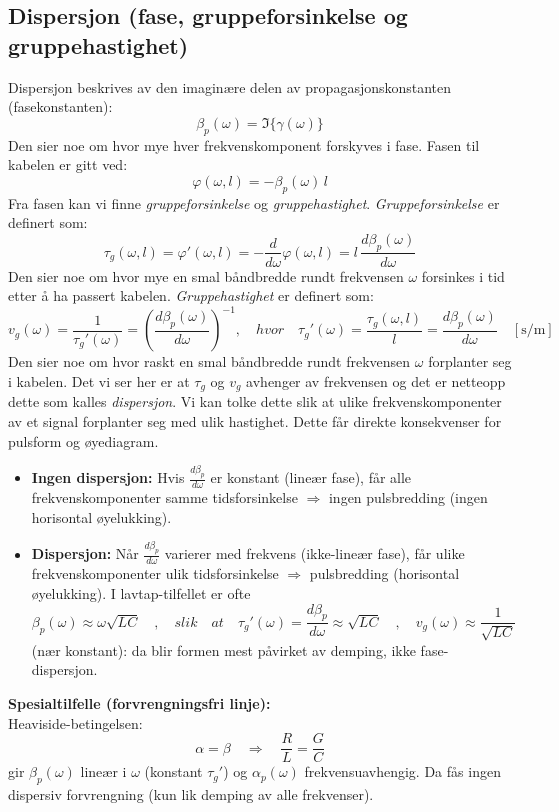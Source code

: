 \subsection{Dispersjon (fase, gruppeforsinkelse og gruppehastighet)}
Dispersjon beskrives av den imaginære delen av propagasjonskonstanten (fasekonstanten):
\[
    \beta_p(\omega)=\Im\{\gamma(\omega)\}
\]
Den sier noe om hvor mye hver frekvenskomponent forskyves i fase.
Fasen til kabelen er gitt ved:
\[
\varphi(\omega,l) = -\beta_p(\omega)\,l
\]
Fra fasen kan vi finne \emph{gruppeforsinkelse} og \emph{gruppehastighet}.
\emph{Gruppeforsinkelse} er definert som:
\[
\tau_g(\omega,l) = \varphi'(\omega,l) = -\frac{d}{d\omega}\varphi(\omega,l) = l\,\frac{d\beta_p(\omega)}{d\omega}
\]
Den sier noe om hvor mye en smal båndbredde rundt frekvensen \(\omega\) forsinkes i tid etter å ha passert kabelen. \emph{Gruppehastighet} er definert som:
\[
v_g(\omega) = \frac{1}{\tau_{g}'(\omega)} = \left(\frac{d\beta_p(\omega)}{d\omega}\right)^{-1}, \quad hvor \quad \tau_g'(\omega) = \frac{\tau_g(\omega,l)}{l} = \frac{d\beta_p(\omega)}{d\omega} \quad [\mathrm{s/m}]
\]
\noindent Den sier noe om hvor raskt en smal båndbredde rundt frekvensen \(\omega\) forplanter seg i kabelen. Det vi ser her er at \(\tau_g\) og \(v_g\) avhenger av frekvensen og det er netteopp dette som kalles \emph{dispersjon}. Vi kan tolke dette slik at ulike frekvenskomponenter av et signal forplanter seg med ulik hastighet. 
\clearpage
\noindent Dette får direkte konsekvenser for pulsform og øyediagram.\\
\begin{itemize}[leftmargin=2.8em,style=nextline]
  \item \textbf{Ingen dispersjon:} Hvis \(\frac{d\beta_p}{d\omega} \) er konstant (lineær fase), får alle frekvenskomponenter samme tidsforsinkelse \(\Rightarrow\) ingen pulsbredding (ingen horisontal øyelukking).\\
  \item \textbf{Dispersjon:} Når \(\frac{d\beta_p}{d\omega}\) varierer med frekvens (ikke-lineær fase), får ulike frekvenskomponenter ulik tidsforsinkelse \(\Rightarrow\) pulsbredding (horisontal øyelukking). I lavtap-tilfellet er ofte 
  \[
    \beta_p(\omega)\approx \omega\sqrt{LC}\quad,\quad slik\quad at \quad \tau_{g}'(\omega)=\frac{d\beta_p}{d\omega}\approx \sqrt{LC}\quad,\quad v_g(\omega)\approx \frac{1}{\sqrt{LC}}
  \]
  (nær konstant): da blir formen mest påvirket av demping, ikke fase-dispersjon.\\
\end{itemize}
\textbf{Spesialtilfelle (forvrengningsfri linje):}\\
Heaviside-betingelsen:
\[
    \alpha = \beta \quad \Rightarrow \quad \frac{R}{L}=\frac{G}{C}
\]
gir \(\beta_p(\omega)\) lineær i \(\omega\)
(konstant \(\tau_g'\)) og \(\alpha_p(\omega)\) frekvensuavhengig. Da fås ingen dispersiv forvrengning (kun lik demping av alle frekvenser).


